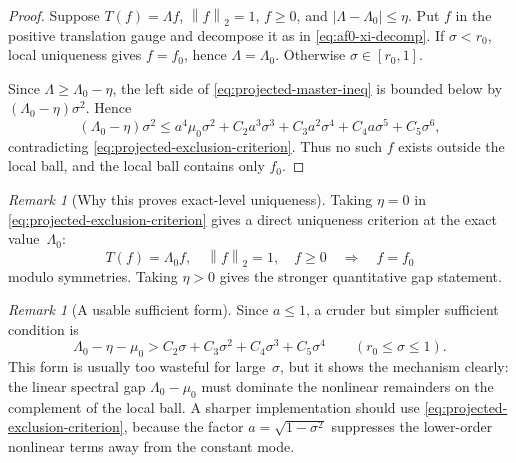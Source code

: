 \documentclass[12pt]{article}
\theoremstyle{definition}
\theoremstyle{remark}
\newtheorem{remark}[theorem]{Remark}
\newcommand{\norm}[1]{\left\|#1\right\|}
\begin{document}
\begin{proof}
  Suppose \(T(f)=\Lambda f\), \(\norm f_2=1\), \(f\geq0\), and
  \(|\Lambda-\Lambda_0|\leq\eta\).  Put \(f\) in the positive translation
  gauge and decompose it as in \eqref{eq:af0-xi-decomp}.  If
  \(\sigma<r_0\), local uniqueness gives \(f=f_0\), hence
  \(\Lambda=\Lambda_0\).  Otherwise \(\sigma\in[r_0,1]\).

  Since \(\Lambda\geq\Lambda_0-\eta\), the left side of
  \eqref{eq:projected-master-ineq} is bounded below by
  \((\Lambda_0-\eta)\sigma^2\).  Hence
  \[
    (\Lambda_0-\eta)\sigma^2
    \leq
    a^4\mu_0\sigma^2
    +C_2a^3\sigma^3
    +C_3a^2\sigma^4
    +C_4a\sigma^5
    +C_5\sigma^6,
  \]
  contradicting \eqref{eq:projected-exclusion-criterion}.  Thus no such
  \(f\) exists outside the local ball, and the local ball contains only
  \(f_0\).
\end{proof}

\begin{remark}[Why this proves exact-level uniqueness]
  Taking \(\eta=0\) in \eqref{eq:projected-exclusion-criterion} gives a
  direct uniqueness criterion at the exact value~\(\Lambda_0\):
  \[
    T(f)=\Lambda_0f,\quad \norm f_2=1,\quad f\geq0
    \quad\Longrightarrow\quad
    f=f_0
  \]
  modulo symmetries.  Taking \(\eta>0\) gives the stronger quantitative
  gap statement.
\end{remark}

\begin{remark}[A usable sufficient form]
  Since \(a\leq1\), a cruder but simpler sufficient condition is
  \begin{equation}\label{eq:projected-crude}
    \Lambda_0-\eta-\mu_0
    >
    C_2\sigma+C_3\sigma^2+C_4\sigma^3+C_5\sigma^4
    \qquad(r_0\leq\sigma\leq1).
  \end{equation}
  This form is usually too wasteful for large~\(\sigma\), but it shows the
  mechanism clearly: the linear spectral gap \(\Lambda_0-\mu_0\) must
  dominate the nonlinear remainders on the complement of the local ball.
  A sharper implementation should use
  \eqref{eq:projected-exclusion-criterion}, because the factor
  \(a=\sqrt{1-\sigma^2}\) suppresses the lower-order nonlinear terms away
  from the constant mode.
\end{remark}
\end{document}
